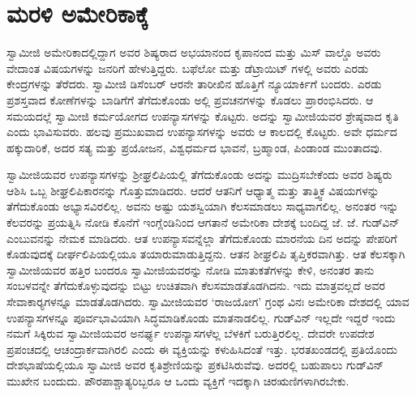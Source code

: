 
\chapter{ಮರಳಿ ಅಮೇರಿಕಾಕ್ಕೆ  }

 ಸ್ವಾಮೀಜಿ ಅಮೇರಿಕಾದಲ್ಲಿದ್ದಾಗ ಅವರ ಶಿಷ್ಯರಾದ ಅಭಯಾನಂದ ಕೃಪಾನಂದ ಮತ್ತು ಮಿಸ್ ವಾಲ್ಡೊ ಅವರು ವೇದಾಂತ ವಿಷಯಗಳನ್ನು ಜನರಿಗೆ ಹೇಳುತ್ತಿದ್ದರು. ಬಫೆಲೋ ಮತ್ತು ಡೆಟ್ರಾಯಿಟ್ ಗಳಲ್ಲಿ ಅವರು ಎರಡು ಕೇಂದ್ರಗಳನ್ನು ತೆರೆದರು. ಸ್ವಾಮೀಜಿ ಡಿಸೆಂಬರ್ ಆರನೇ ತಾರೀಖಿನ ಹೊತ್ತಿಗೆ ನ್ಯೂಯಾರ್ಕಿಗೆ ಬಂದರು. ಎರಡು ಪ್ರಶಸ್ತವಾದ ಕೋಣೆಗಳನ್ನು ಬಾಡಿಗೆಗೆ ತೆಗೆದುಕೊಂಡು ಅಲ್ಲಿ ಪ್ರವಚನಗಳನ್ನು ಕೊಡಲು ಪ್ರಾರಂಭಿಸಿದರು. ಆ ಸಮಯದಲ್ಲೆ ಸ್ವಾಮೀಜಿ ಕರ್ಮಯೋಗದ ಉಪನ್ಯಾಸಗಳನ್ನು ಕೊಟ್ಟರು. ಅದನ್ನು ಸ್ವಾಮೀಜಿಯವರ ಶ್ರೇಷ್ಠವಾದ ಕೃತಿ ಎಂದು ಭಾವಿಸುವರು. ಹಲವು ಪ್ರಮುಖವಾದ ಉಪನ್ಯಾಸಗಳನ್ನು ಅವರು ಆ ಕಾಲದಲ್ಲಿ ಕೊಟ್ಟರು. ಅವೇ ಧರ್ಮದ ಹಕ್ಕುದಾರಿಕೆ, ಅದರ ಸತ್ಯ ಮತ್ತು ಪ್ರಯೋಜನ, ವಿಶ್ವಧರ್ಮದ ಭಾವನೆ, ಬ್ರಹ್ಮಾಂಡ, ಪಿಂಡಾಂಡ ಮುಂತಾದವು. 

 ಸ್ವಾಮೀಜಿಯವರ ಉಪನ್ಯಾಸಗಳನ್ನು ಶ‍್ರೀಘ್ರಲಿಪಿಯಲ್ಲಿ ತೆಗೆದುಕೊಂಡು ಅದನ್ನು ಮುದ್ರಿಸಬೇಕೆಂದು ಅವರ ಶಿಷ್ಯರು ಆಶಿಸಿ ಒಬ್ಬ ಶೀಘ್ರಲಿಪಿಕಾರನನ್ನು ಗೊತ್ತುಮಾಡಿದರು. ಆದರೆ ಆತನಿಗೆ ಆಧ್ಯಾತ್ಮ ಮತ್ತು ತಾತ್ತ್ವಿಕ ವಿಷಯಗಳನ್ನು ತೆಗೆದುಕೊಂಡು ಅಭ್ಯಾಸವಿರಲಿಲ್ಲ. ಅವನು ಅಷ್ಟು ಯಶಸ್ವಿಯಾಗಿ ಕೆಲಸಮಾಡಲು ಸಾಧ್ಯವಾಗಲಿಲ್ಲ. ಅನಂತರ ಇನ್ನು ಕೆಲವರನ್ನು ಪ್ರಯತ್ನಿಸಿ ನೋಡಿ ಕೊನೆಗೆ ಇಂಗ್ಲೆಂಡಿನಿಂದ ಆಗತಾನೆ ಅಮೇರಿಕಾ ದೇಶಕ್ಕೆ ಬಂದಿದ್ದ ಜೆ. ಜೆ. ಗುಡ್‍ವಿನ್ ಎಂಬುವನನ್ನು ನೇಮಕ ಮಾಡಿದರು. ಆತ ಉಪನ್ಯಾಸವನ್ನೆಲ್ಲಾ ತೆಗೆದುಕೊಂಡು ಮಾರನೆಯ ದಿನ ಅದನ್ನು ಪೇಪರಿಗೆ ಕೊಡುವುದಕ್ಕೆ ದೀರ್ಘಲಿಪಿಯಲ್ಲಿಯೂ ತಯಾರುಮಾಡುತ್ತಿದ್ದನು. ಆತನ ಶೀಘ್ರಲಿಪಿ ತೃಪ್ತಿಕರವಾಗಿತ್ತು. ಆತ ಕೆಲಸಕ್ಕಾಗಿ ಸ್ವಾಮೀಜಿಯವರ ಹತ್ತಿರ ಬಂದರೂ ಸ್ವಾಮೀಜಿಯವರನ್ನು ನೋಡಿ ಮಾತುಕತೆಗಳನ್ನು ಕೇಳಿ, ಅನಂತರ ತಾನು ಸಂಬಳವನ್ನೇ ತೆಗೆದುಕೊಳ್ಳುವುದನ್ನು ಬಿಟ್ಟು ಉಚಿತವಾಗಿ ಕೆಲಸಮಾಡತೊಡಗಿದನು. ಇದು ಮಾತ್ರವಲ್ಲದೆ ಅವರ ಸೇವಾಕಾರ‍್ಯಗಳನ್ನೂ ಮಾಡತೊಡಗಿದರು. ಸ್ವಾಮೀಜಿಯವರ ‘ರಾಜಯೋಗ’ ಗ್ರಂಥ ವಿನಃ ಅಮೇರಿಕಾ ದೇಶದಲ್ಲಿ ಯಾವ ಉಪನ್ಯಾಸಗಳನ್ನೂ ಪೂರ್ವಭಾವಿಯಾಗಿ ಸಿದ್ಧಮಾಡಿಕೊಂಡು ಮಾತನಾಡಲಿಲ್ಲ. ಗುಡ್‍ವಿನ್ ಇಲ್ಲದೇ ಇದ್ದರೆ ಇಂದು ನಮಗೆ ಸಿಕ್ಕಿರುವ ಸ್ವಾಮೀಜಿಯವರ ಅನರ್ಘ್ಯ ಉಪನ್ಯಾಸಗಳೆಲ್ಲ ಬೆಳಕಿಗೆ ಬರುತ್ತಿರಲಿಲ್ಲ. ದೇವರೇ ಉಪದೇಶ ಪ್ರಪಂಚದಲ್ಲಿ ಆಚಂದ್ರಾರ್ಕವಾಗಿರಲಿ ಎಂದು ಈ ವ್ಯಕ್ತಿಯನ್ನು ಕಳುಹಿಸಿದಂತೆ ಇತ್ತು. ಭರತಖಂಡದಲ್ಲಿ ಪ್ರತಿಯೊಂದು ದೇಶಭಾಷೆಯಲ್ಲಿಯೂ ಸ್ವಾಮೀಜಿ ಅವರ ಕೃತಿಶ್ರೇಣಿಯನ್ನು ಪ್ರಕಟಿಸಿರುವೆವು. ಅದರಲ್ಲಿ ಬಹುಪಾಲು ಗುಡ್‍ವಿನ್ ಮುಖೇನ ಬಂದುದು. ಪೌರಪಾಶ್ಚಾತ್ಯರಿಬ್ಬರೂ ಆ ಒಂದು ವ್ಯಕ್ತಿಗೆ ಇದಕ್ಕಾಗಿ ಚಿರಋಣಿಗಳಾಗಿರಬೇಕು. 

